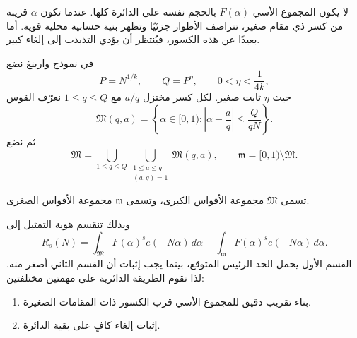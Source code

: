 لا يكون المجموع الأسي $F(\alpha)$ بالحجم نفسه على الدائرة كلها. عندما تكون $\alpha$ قريبة من كسر ذي مقام صغير، تتراصف الأطوار جزئيًا وتظهر بنية حسابية محلية قوية. أما بعيدًا عن هذه الكسور، فيُنتظر أن يؤدي التذبذب إلى إلغاء كبير.

في نموذج وارينغ نضع
\[
P=N^{1/k},
\qquad
Q=P^{\eta},
\qquad
0<\eta<\frac{1}{4k},
\]
حيث $\eta$ ثابت صغير. لكل كسر مختزل $a/q$ مع $1\le q\le Q$ نعرّف القوس
\[
\mathfrak M(q,a)
=
\left\{\alpha\in[0,1):
\left|\alpha-\frac aq\right|
\le \frac{Q}{qN}
\right\}.
\]
ثم نضع
\[
\mathfrak M
=
\bigcup_{1\le q\le Q}
\bigcup_{\substack{1\le a\le q\\(a,q)=1}}
\mathfrak M(q,a),
\qquad
\mathfrak m=[0,1)\setminus\mathfrak M.
\]

\begin{definition}
تسمى $\mathfrak M$ مجموعة الأقواس الكبرى، وتسمى $\mathfrak m$ مجموعة الأقواس الصغرى.
\end{definition}

وبذلك تنقسم هوية التمثيل إلى
\[
R_s(N)
=
\int_{\mathfrak M}F(\alpha)^s e(-N\alpha)\,d\alpha
+
\int_{\mathfrak m}F(\alpha)^s e(-N\alpha)\,d\alpha.
\]
القسم الأول يحمل الحد الرئيس المتوقع، بينما يجب إثبات أن القسم الثاني أصغر منه. لذا تقوم الطريقة الدائرية على مهمتين مختلفتين:
\begin{enumerate}
\item بناء تقريب دقيق للمجموع الأسي قرب الكسور ذات المقامات الصغيرة.
\item إثبات إلغاء كافٍ على بقية الدائرة.
\end{enumerate}

\begin{antfigure}
\caption{متتالية فاري من الرتبة \(5\) (11 كسرًا مختزلًا، محسوبة مباشرة
بخوارزمية فاري القياسية) موزعة على الدائرة \([0,1)\) بالتناظر
\(a/q\mapsto360^\circ\cdot a/q\). الأقواس الزرقاء الغليظة حول الكسور ذات
المقام الأصغر (\(q\le2\)) توضّح موضع الأقواس الكبرى \(\mathfrak M(q,a)\)
تخطيطيًا فقط؛ عرضها هنا ثابت للعرض ولا يمثّل نصف القطر الفعلي
\(Q/(qN)\) من التعريف أعلاه.}
\label{fig:farey-dissection-order-5}
\end{antfigure}

